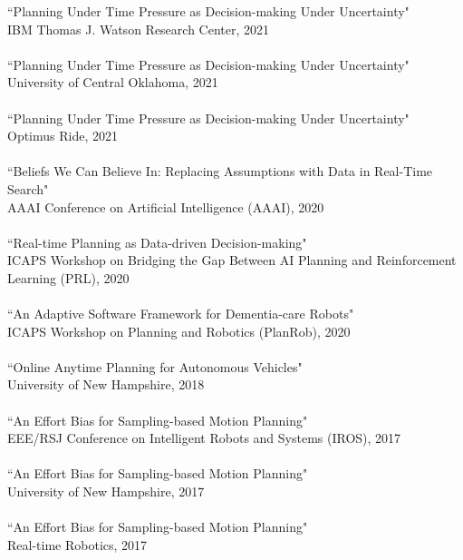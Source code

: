 \documentclass[margin, 10pt]{res} %
\begin{document}
\begin{resume}
``Planning Under Time Pressure as Decision-making Under Uncertainty"\\
\-\hspace{0.5cm} IBM Thomas J. Watson Research Center, 2021\\~\\
``Planning Under Time Pressure as Decision-making Under Uncertainty"\\
\-\hspace{0.5cm} University of Central Oklahoma, 2021\\~\\
``Planning Under Time Pressure as Decision-making Under Uncertainty"\\
\-\hspace{0.5cm} Optimus Ride, 2021\\~\\
``Beliefs We Can Believe In: Replacing Assumptions with Data in Real-Time Search"\\
\-\hspace{0.5cm} AAAI Conference on Artificial Intelligence (AAAI), 2020\\~\\
``Real-time Planning as Data-driven Decision-making"\\
\-\hspace{0.5cm} ICAPS Workshop on Bridging the Gap Between AI Planning and Reinforcement Learning (PRL), 2020\\~\\
``An Adaptive Software Framework for Dementia-care Robots"\\
\-\hspace{0.5cm} ICAPS Workshop on Planning and Robotics (PlanRob), 2020\\~\\
``Online Anytime Planning for Autonomous Vehicles"\\
\-\hspace{0.5cm} University of New Hampshire, 2018\\~\\
``An Effort Bias for Sampling-based Motion Planning"\\
\-\hspace{0.5cm} EEE/RSJ Conference on Intelligent Robots and Systems (IROS), 2017\\~\\
``An Effort Bias for Sampling-based Motion Planning"\\
\-\hspace{0.5cm} University of New Hampshire, 2017\\~\\
``An Effort Bias for Sampling-based Motion Planning"\\
\-\hspace{0.5cm} Real-time Robotics, 2017


\end{resume}
\end{document}
